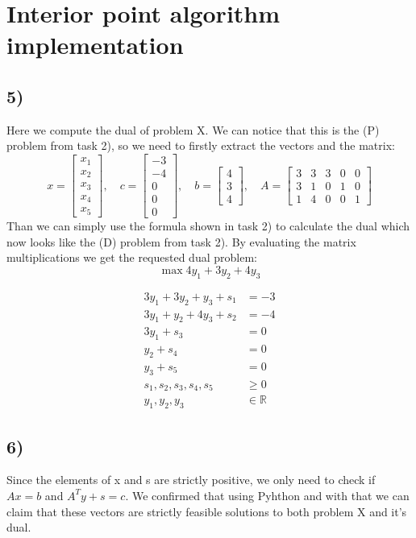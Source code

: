 \documentclass[9pt]{IEEEtran}
\begin{document}
\section{Interior point algorithm implementation}
\subsection*{5)}
Here we compute the dual of problem X. We can notice that this is 
the (P) problem from task 2), so we need to firstly extract the vectors and 
the  matrix: 
\[
x = 
\begin{bmatrix} x_1 \\ x_2 \\ x_3 \\ x_4 \\ x_5 \end{bmatrix}, \quad
c = 
\begin{bmatrix} -3 \\ -4 \\ 0 \\ 0 \\ 0 \end{bmatrix}, \quad
b = 
\begin{bmatrix} 4 \\ 3 \\ 4 \end{bmatrix}, \quad
A = 
\begin{bmatrix}
3 & 3 & 3 & 0 & 0 \\
3 & 1 & 0 & 1 & 0 \\
1 & 4 & 0 & 0 & 1
\end{bmatrix}
\]
Than we can simply use the formula shown in task 2) to calculate the dual which 
now looks like the (D) problem from task 2). By evaluating the matrix 
multiplications we get the requested dual problem:
\[
\max 4y_1 + 3y_2 + 4y_3
\]

\[
\begin{aligned}
3y_1 + 3y_2 + y_3 + s_1 &= -3 \\
3y_1 + y_2 + 4y_3 + s_2 &= -4 \\
3y_1 + s_3 &= 0 \\
y_2 + s_4 &= 0 \\
y_3 + s_5 &= 0 \\
s_1, s_2, s_3, s_4, s_5 &\ge 0 \\
y_1, y_2, y_3 &\in \mathbb{R}
\end{aligned}
\]
\subsection*{6)}
Since the elements of x and s are strictly positive, we only need to check 
if $A x = b$ and $A^T y + s = c$. We confirmed that using Pyhthon and with that 
we can claim that these vectors are strictly feasible solutions to both 
problem X and it's dual.
\end{document}
